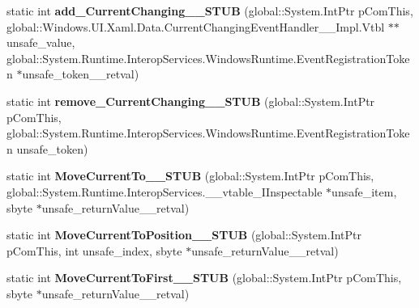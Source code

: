 \begin{DoxyCompactItemize}
static int {\bfseries add\+\_\+\+Current\+Changing\+\_\+\+\_\+\+S\+T\+UB} (global\+::\+System.\+Int\+Ptr p\+Com\+This, global\+::\+Windows.\+U\+I.\+Xaml.\+Data.\+Current\+Changing\+Event\+Handler\+\_\+\+\_\+\+Impl.\+Vtbl $\ast$$\ast$unsafe\+\_\+value, global\+::\+System.\+Runtime.\+Interop\+Services.\+Windows\+Runtime.\+Event\+Registration\+Token $\ast$unsafe\+\_\+token\+\_\+\+\_\+retval)
\item 
\mbox{\label{struct_windows_1_1_u_i_1_1_xaml_1_1_data_1_1_i_collection_view_____impl_1_1_vtbl_a74e483460b0375c0928a50f0ef415857}} 
static int {\bfseries remove\+\_\+\+Current\+Changing\+\_\+\+\_\+\+S\+T\+UB} (global\+::\+System.\+Int\+Ptr p\+Com\+This, global\+::\+System.\+Runtime.\+Interop\+Services.\+Windows\+Runtime.\+Event\+Registration\+Token unsafe\+\_\+token)
\item 
\mbox{\label{struct_windows_1_1_u_i_1_1_xaml_1_1_data_1_1_i_collection_view_____impl_1_1_vtbl_a109a672ff1536557e5457d68a538c05b}} 
static int {\bfseries Move\+Current\+To\+\_\+\+\_\+\+S\+T\+UB} (global\+::\+System.\+Int\+Ptr p\+Com\+This, global\+::\+System.\+Runtime.\+Interop\+Services.\+\_\+\+\_\+vtable\+\_\+\+I\+Inspectable $\ast$unsafe\+\_\+item, sbyte $\ast$unsafe\+\_\+return\+Value\+\_\+\+\_\+retval)
\item 
\mbox{\label{struct_windows_1_1_u_i_1_1_xaml_1_1_data_1_1_i_collection_view_____impl_1_1_vtbl_a8abc18ec18e4a9f620a61ac0e59b977b}} 
static int {\bfseries Move\+Current\+To\+Position\+\_\+\+\_\+\+S\+T\+UB} (global\+::\+System.\+Int\+Ptr p\+Com\+This, int unsafe\+\_\+index, sbyte $\ast$unsafe\+\_\+return\+Value\+\_\+\+\_\+retval)
\item 
\mbox{\label{struct_windows_1_1_u_i_1_1_xaml_1_1_data_1_1_i_collection_view_____impl_1_1_vtbl_a9dfef5457d014e6deffc3bafd87be8bf}} 
static int {\bfseries Move\+Current\+To\+First\+\_\+\+\_\+\+S\+T\+UB} (global\+::\+System.\+Int\+Ptr p\+Com\+This, sbyte $\ast$unsafe\+\_\+return\+Value\+\_\+\+\_\+retval)
\item 
\mbox{\label{struct_windows_1_1_u_i_1_1_xaml_1_1_data_1_1_i_collection_view_____impl_1_1_vtbl_a52e8e47bad9fe0ee5b821399f8a80575}} 
$$
\end{DoxyCompactItemize}
